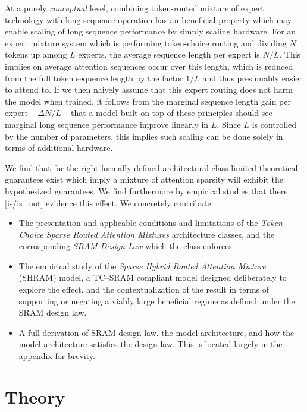 \documentclass[11pt]{article}
\begin{document}
At a purely \emph{conceptual} level, combining token-routed mixture of expert technology with long-sequence operation has an beneficial property which may enable scaling of long sequence performance by simply scaling hardware. For an expert mixture system which is performing token-choice routing and dividing $N$ tokens up among $L$ experts, the average sequence length per expert is $N/L$. This implies on average attention sequences occur over this length, which is reduced from the full token sequence length by the factor $1/L$ and thus presumably easier to attend to. If we then naively assume that this expert routing does not harm the model when trained, it follows from the marginal sequence length gain per expert -- $\Delta N / L$ -- that a model built on top of these principles should see marginal long sequence performance improve linearly in $L$. Since $L$ is controlled by the number of parameters, this implies such scaling can be done solely in terms of additional hardware.

We find that for the right formally defined architectural class limited theoretical guarantees exist which imply a mixture of attention sparsity will exhibit the hypothesized guarantees. We find furthermore by empirical studies that there [is/is\_not] evidence this effect. We concretely contribute:

\begin{itemize}
    \item The presentation and applicable conditions and limitations of the \emph{Token-Choice Sparse Routed Attention Mixtures} architecture classes, and the corrosponding \emph{SRAM Design Law} which the class enforces.
    \item The empirical study of the \emph{Sparse Hybrid Routed Attention Mixture} (SHRAM) model, a TC--SRAM compliant model designed deliberately to explore the effect, and the contextualization of the result in terms of supporting or negating a viably large beneficial regime as defined under the SRAM design law.
    \item A full derivation of SRAM design law. the model architecture, and how the model architecture satisfies the design law. This is located largely in the appendix for brevity.
\end{itemize}

\section{Theory}
\label{sec:theory}
\end{document}
